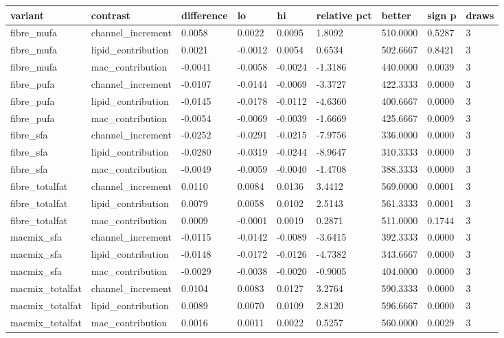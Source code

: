 {\footnotesize\setlength{\tabcolsep}{3pt}
\begin{longtable}{lllllllll}
\toprule
\textbf{variant} & \textbf{contrast} & \textbf{difference} & \textbf{lo} & \textbf{hi} & \textbf{relative pct} & \textbf{better} & \textbf{sign p} & \textbf{draws} \\
\midrule
\endhead
fibre\_mufa & channel\_increment & 0.0058 & 0.0022 & 0.0095 & 1.8092 & 510.0000 & 0.5287 & 3 \\
fibre\_mufa & lipid\_contribution & 0.0021 & -0.0012 & 0.0054 & 0.6534 & 502.6667 & 0.8421 & 3 \\
fibre\_mufa & mac\_contribution & -0.0041 & -0.0058 & -0.0024 & -1.3186 & 440.0000 & 0.0039 & 3 \\
fibre\_pufa & channel\_increment & -0.0107 & -0.0144 & -0.0069 & -3.3727 & 422.3333 & 0.0000 & 3 \\
fibre\_pufa & lipid\_contribution & -0.0145 & -0.0178 & -0.0112 & -4.6360 & 400.6667 & 0.0000 & 3 \\
fibre\_pufa & mac\_contribution & -0.0054 & -0.0069 & -0.0039 & -1.6669 & 425.6667 & 0.0009 & 3 \\
fibre\_sfa & channel\_increment & -0.0252 & -0.0291 & -0.0215 & -7.9756 & 336.0000 & 0.0000 & 3 \\
fibre\_sfa & lipid\_contribution & -0.0280 & -0.0319 & -0.0244 & -8.9647 & 310.3333 & 0.0000 & 3 \\
fibre\_sfa & mac\_contribution & -0.0049 & -0.0059 & -0.0040 & -1.4708 & 388.3333 & 0.0000 & 3 \\
fibre\_totalfat & channel\_increment & 0.0110 & 0.0084 & 0.0136 & 3.4412 & 569.0000 & 0.0001 & 3 \\
fibre\_totalfat & lipid\_contribution & 0.0079 & 0.0058 & 0.0102 & 2.5143 & 561.3333 & 0.0001 & 3 \\
fibre\_totalfat & mac\_contribution & 0.0009 & -0.0001 & 0.0019 & 0.2871 & 511.0000 & 0.1744 & 3 \\
macmix\_sfa & channel\_increment & -0.0115 & -0.0142 & -0.0089 & -3.6415 & 392.3333 & 0.0000 & 3 \\
macmix\_sfa & lipid\_contribution & -0.0148 & -0.0172 & -0.0126 & -4.7382 & 343.6667 & 0.0000 & 3 \\
macmix\_sfa & mac\_contribution & -0.0029 & -0.0038 & -0.0020 & -0.9005 & 404.0000 & 0.0000 & 3 \\
macmix\_totalfat & channel\_increment & 0.0104 & 0.0083 & 0.0127 & 3.2764 & 590.3333 & 0.0000 & 3 \\
macmix\_totalfat & lipid\_contribution & 0.0089 & 0.0070 & 0.0109 & 2.8120 & 596.6667 & 0.0000 & 3 \\
macmix\_totalfat & mac\_contribution & 0.0016 & 0.0011 & 0.0022 & 0.5257 & 560.0000 & 0.0029 & 3 \\
\bottomrule
\end{longtable}}
